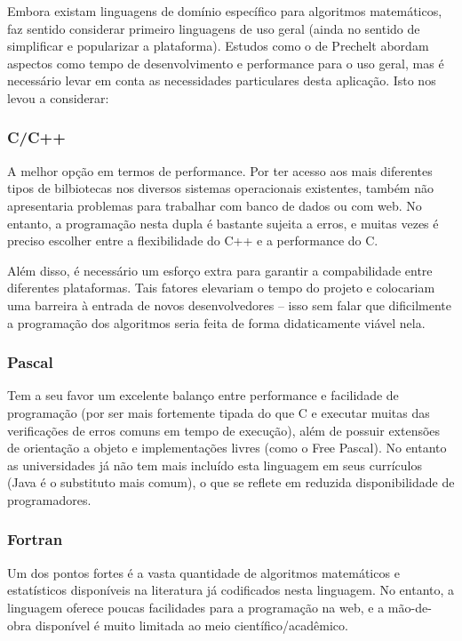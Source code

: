 \documentclass{abnt}
\begin{document}
Embora existam linguagens de domínio específico para algoritmos matemáticos, faz sentido considerar primeiro linguagens de uso geral (ainda no sentido de simplificar e popularizar a plataforma). Estudos como o de Prechelt\cite{Prechelt} abordam aspectos como tempo de desenvolvimento e performance para o uso geral, mas é necessário levar em conta as necessidades particulares desta aplicação. Isto nos levou a considerar:

\subsubsection{C/C++}
A melhor opção em termos de performance. Por ter acesso aos mais diferentes tipos de bilbiotecas nos diversos sistemas operacionais existentes, também não apresentaria problemas para trabalhar com banco de dados ou com web. No entanto, a programação nesta dupla é bastante sujeita a erros, e muitas vezes é preciso escolher entre a flexibilidade do C++ e a performance do C.

Além disso, é necessário um esforço extra para garantir a compabilidade entre diferentes plataformas. Tais fatores elevariam o tempo do  projeto e colocariam uma barreira à entrada de novos desenvolvedores – isso sem falar que dificilmente a programação dos algoritmos seria feita de forma didaticamente viável nela.

\subsubsection{Pascal}
Tem a seu favor um excelente balanço entre performance e facilidade de programação (por ser mais fortemente tipada do que C e executar muitas das verificações de erros comuns em tempo de execução), além de possuir extensões de orientação a objeto e implementações livres (como o Free Pascal). No entanto as universidades já não tem mais incluído esta linguagem em seus currículos (Java é o substituto mais comum), o que se reflete em reduzida disponibilidade de programadores.

\subsubsection{Fortran}
Um dos pontos fortes é a vasta quantidade de algoritmos matemáticos e estatísticos disponíveis na literatura já codificados nesta linguagem. No entanto, a linguagem oferece poucas facilidades para a programação na web, e a mão-de-obra disponível é muito limitada ao meio científico/acadêmico.
\end{document}
